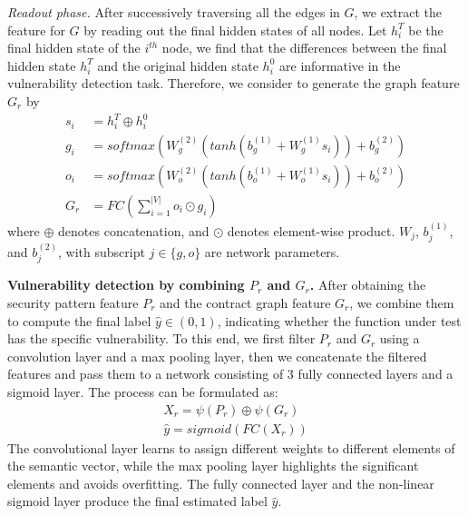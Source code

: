 \emph{Readout phase.} After successively traversing all the edges in $G$, we extract the feature for $G$ by reading out the final hidden states of all nodes. Let $h^{T}_{i}$ be the final hidden state of the $i^{th}$ node, we find that the differences between the final hidden state $h^{T}_{i}$ and the original hidden state $h^{0}_{i}$ are informative in the vulnerability detection task. Therefore, we consider to generate the graph  feature $G_{r}$ by
\begin{align}
\label{eq:e3}
s_{i} &= h^{T}_{i}\oplus h^{0}_{i} \\
g_{i} &= softmax(W^{(2)}_{g}(tanh(b^{(1)}_{g} + W^{(1)}_{g}s_{i})) + b^{(2)}_{g}) \\
o_{i} &= softmax(W^{(2)}_{o}(tanh(b^{(1)}_{o} + W^{(1)}_{o}s_{i})) + b^{(2)}_{o}) \\
G_{r} &= FC(\sum^{|V|}_{i = 1}o_{i} \odot g_{i})
\end{align}
where $\oplus$ denotes concatenation, and $\odot$ denotes element-wise product. $W_{j}$, $b^{(1)}_{j}$, and $b^{(2)}_{j}$, with subscript $j \in \{g, o\}$ are network parameters.

\textbf{Vulnerability detection by combining $P_r$ and $G_r$.} After obtaining the security pattern feature $P_{r}$ and the contract graph feature $G_{r}$, we combine them to compute the final label $\hat{y} \in (0, 1)$, indicating whether the function under test has the specific vulnerability. To this end, we first filter $P_{r}$ and $G_{r}$ using a convolution layer and a max pooling layer, then we concatenate the filtered features and pass them to a network consisting of 3 fully connected layers and a sigmoid layer. The process can be formulated as: 
\begin{align}
\label{eq:e4}
X_{r} = \psi(P_{r}) \oplus \psi(G_{r}) \\
\hat{y} = sigmoid(FC(X_{r}))
\end{align}
The convolutional layer learns to assign different weights to different elements of the semantic vector, while the max pooling layer highlights the significant elements and avoids overfitting. The fully connected layer and the non-linear sigmoid layer produce the final estimated label $\hat{y}$.

\vspace{-0.7em}
